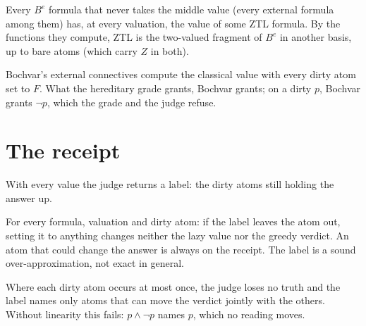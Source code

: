 \begin{theorem}\label{thm:externalztl}
  \leanok
  Every $B^e$ formula that never takes the middle value (every external
  formula among them) has, at every valuation, the value of some ZTL formula.
  By the functions they compute, ZTL is the two-valued fragment of $B^e$ in
  another basis, up to bare atoms (which carry $Z$ in both).
\end{theorem}

\begin{theorem}[Bochvar is the default ``dirty := false'']\label{thm:bochdefault}
  \leanok
  Bochvar's external connectives compute the classical value with every dirty
  atom set to $F$. What the hereditary grade grants, Bochvar grants; on a
  dirty $p$, Bochvar grants $\neg p$, which the grade and the judge refuse.
\end{theorem}

\chapter{The receipt}

\begin{definition}\label{def:label}
  \leanok
  With every value the judge returns a label: the dirty atoms still holding the
  answer up.
\end{definition}

\begin{theorem}\label{thm:receipt}
  \leanok
  For every formula, valuation and dirty atom: if the label leaves the atom
  out, setting it to anything changes neither the lazy value nor the greedy
  verdict. An atom that could change the answer is always on the receipt. The
  label is a sound over-approximation, not exact in general.
\end{theorem}

\begin{theorem}\label{thm:labelexact}
  \leanok
  Where each dirty atom occurs at most once, the judge loses no truth and the
  label names only atoms that can move the verdict jointly with the others.
  Without linearity this fails: $p\wedge\neg p$ names $p$, which no reading
  moves.
\end{theorem}

